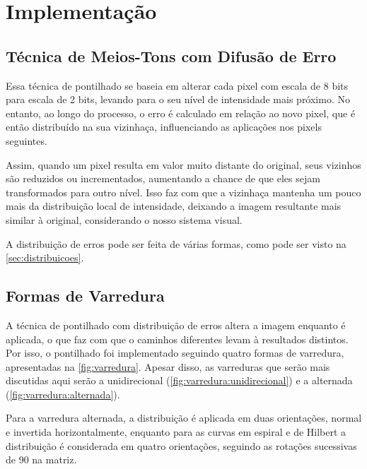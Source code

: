\section{Implementação} \label{sec:impl}

\subsection{Técnica de Meios-Tons com Difusão de Erro}

    Essa técnica de pontilhado se baseia em alterar cada pixel com escala de 8 bits para escala de 2 bits, levando para o seu nível de intensidade mais próximo. No entanto, ao longo do processo, o erro é calculado em relação ao novo pixel, que é então distribuído na sua vizinhaça, influenciando as aplicações nos pixels seguintes.

    Assim, quando um pixel resulta em valor muito distante do original, seus vizinhos são reduzidos ou incrementados, aumentando a chance de que eles sejam transformados para outro nível. Isso faz com que a vizinhaça mantenha um pouco mais da distribuição local de intensidade, deixando a imagem resultante mais similar à original, considerando o nosso sistema visual.

    A distribuição de erros pode ser feita de várias formas, como pode ser visto na \cref{sec:distribuicoes}.

\subsection{Formas de Varredura} \label{sec:varredura}

    A técnica de pontilhado com distribuição de erros altera a imagem enquanto é aplicada, o que faz com que o caminhos diferentes levam à resultados distintos. Por isso, o pontilhado foi implementado seguindo quatro formas de varredura, apresentadas na \cref{fig:varredura}. Apesar disso, as varreduras que serão mais discutidas aqui serão a unidirecional (\ref{fig:varredura:unidirecional}) e a alternada (\ref{fig:varredura:alternada}).



    Para a varredura alternada, a distribuição é aplicada em duas orientações, normal e invertida horizontalmente, enquanto para as curvas em espiral e de Hilbert a distribuição é considerada em quatro orientações, seguindo as rotações sucessivas de 90\textdegree{} na matriz.

